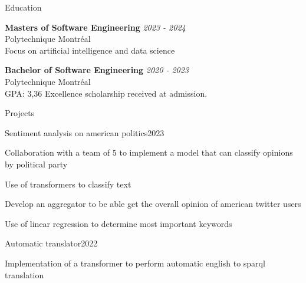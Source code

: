 \documentclass{resume} %
\begin{document}
	
	
	\begin{rSection}{Education}

		{\bf Masters of Software Engineering} \hfill {\em 2023 - 2024} 
		\\ Polytechnique Montréal
		\\ Focus on artificial intelligence and data science
		
		{\bf Bachelor of Software Engineering} \hfill {\em 2020 - 2023} 
		\\ Polytechnique Montréal
		\\GPA: 3,36 \hspace{0.5cm}  Excellence scholarship received at admission.
		
		
	\end{rSection}
	
	\begin{rSection}{Projects}
		\begin{rSubsection}{Sentiment analysis on american politics}{2023}{}{}
			\item Collaboration with a team of 5 to implement a model that can classify opinions by political party
			\item Use of transformers to classify text
			\item Develop an aggregator to be able get the overall opinion of american twitter users
			\item Use of linear regression to determine most important keywords
		 \end{rSubsection}
		\begin{rSubsection}{Automatic translator}{2022}{}{}
			\item Implementation of a transformer to perform automatic english to sparql translation
		 \end{rSubsection}
		
	\end{rSection}
	
	
	
\end{document}
